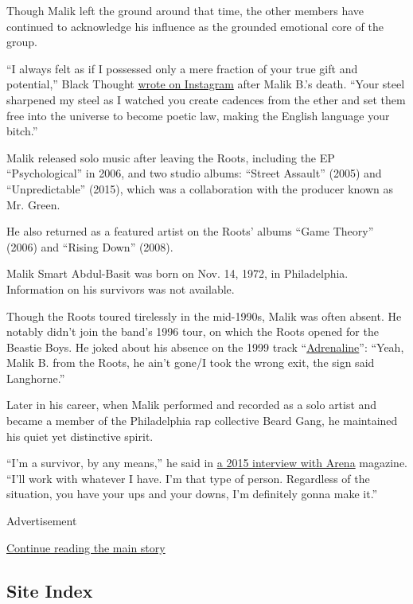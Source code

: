 Though Malik left the ground around that time, the other members have
continued to acknowledge his influence as the grounded emotional core of
the group.

``I always felt as if I possessed only a mere fraction of your true gift
and potential,'' Black Thought
\href{https://www.instagram.com/p/CDPLu1nFpft/}{wrote on Instagram}
after Malik B.'s death. ``Your steel sharpened my steel as I watched you
create cadences from the ether and set them free into the universe to
become poetic law, making the English language your bitch.''

Malik released solo music after leaving the Roots, including the EP
``Psychological'' in 2006, and two studio albums: ``Street Assault''
(2005) and ``Unpredictable'' (2015), which was a collaboration with the
producer known as Mr. Green.

He also returned as a featured artist on the Roots' albums ``Game
Theory'' (2006) and ``Rising Down'' (2008).

Malik Smart Abdul-Basit was born on Nov. 14, 1972, in Philadelphia.
Information on his survivors was not available.

Though the Roots toured tirelessly in the mid-1990s, Malik was often
absent. He notably didn't join the band's 1996 tour, on which the Roots
opened for the Beastie Boys. He joked about his absence on the 1999
track ``\href{https://genius.com/20831}{Adrenaline}'': ``Yeah, Malik B.
from the Roots, he ain't gone/I took the wrong exit, the sign said
Langhorne.''

Later in his career, when Malik performed and recorded as a solo artist
and became a member of the Philadelphia rap collective Beard Gang, he
maintained his quiet yet distinctive spirit.

``I'm a survivor, by any means,'' he said in
\href{https://arena.com/article/malik-b-and-mr-green-rooted-in-reality}{a
2015 interview with Arena} magazine. ``I'll work with whatever I have.
I'm that type of person. Regardless of the situation, you have your ups
and your downs, I'm definitely gonna make it.''

Advertisement

\protect\hyperlink{after-bottom}{Continue reading the main story}

\hypertarget{site-index}{%
\subsection{Site Index}\label{site-index}}


